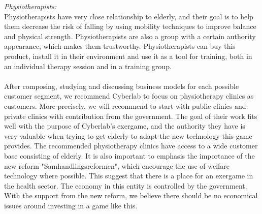 \emph{Physiotherapists:} \\
Physiotherapists have very close relationship to elderly, and their goal is to help them decrease the risk of falling by using mobility techniques to improve balance and physical strength. Physiotherapists are also a group with a certain authority appearance, which makes them trustworthy. Physiotherapists can buy this product, install it in their environment and use it as a tool for training, both in an individual therapy session and in a training group. \\ \\
After composing, studying and discussing business models for each possible customer segment, we recommend Cyberlab to focus on physiotherapy clinics as customers. More precisely,  we will recommend to start with public clinics and private clinics with contribution from the government. The goal of their work fits well with the purpose of Cyberlab's exergame, and the authority they have is very valuable when trying to get elderly to adapt the new technology this game provides. The recommended physiotherapy clinics have access to a wide customer base consisting of elderly. It is also important to emphasis the importance of the new reform "Samhandlingsreformen", which encourage the use of welfare technology where possible. This suggest that there is a place for an exergame in the health sector.  The economy in this entity is controlled by the government. With the support from the new reform, we believe there should be no economical issues around investing in a game like this. 

